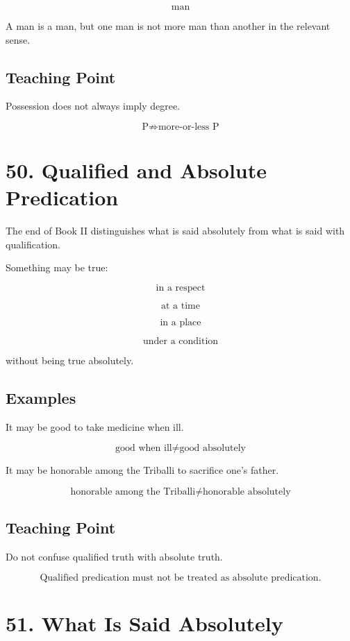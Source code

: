 \documentclass[12pt]{article}
\begin{document}
\[
\text{man}
\]

A man is a man, but one man is not more man than another in the relevant sense.

\subsection*{Teaching Point}

Possession does not always imply degree.

\[
\boxed{
\text{P} \not\Rightarrow \text{more-or-less P}
}
\]

\section*{50. Qualified and Absolute Predication}

The end of Book II distinguishes what is said absolutely from what is said with
qualification.

Something may be true:

\[
\text{in a respect}
\]

\[
\text{at a time}
\]

\[
\text{in a place}
\]

\[
\text{under a condition}
\]

without being true absolutely.

\subsection*{Examples}

It may be good to take medicine when ill.

\[
\text{good when ill} \neq \text{good absolutely}
\]

It may be honorable among the Triballi to sacrifice one's father.

\[
\text{honorable among the Triballi} \neq \text{honorable absolutely}
\]

\subsection*{Teaching Point}

Do not confuse qualified truth with absolute truth.

\[
\boxed{
\text{Qualified predication must not be treated as absolute predication.}
}
\]

\section*{51. What Is Said Absolutely}
\end{document}
